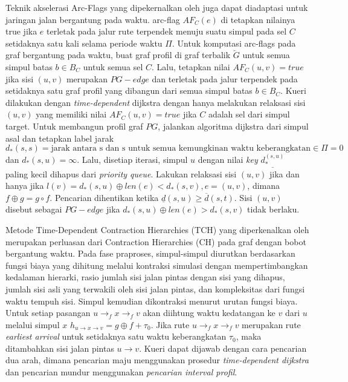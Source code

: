 Teknik akselerasi Arc-Flags yang dipekernalkan oleh \cite{Kohler2005} juga dapat diadaptasi untuk jaringan jalan bergantung pada waktu.  arc-flag $AF_C(e)$ di tetapkan nilainya true jika $e$ terletak pada jalur rute terpendek menuju suatu simpul pada sel $C$ setidaknya satu kali selama periode waktu $\Pi$. Untuk komputasi arc-flags pada graf bergantung pada waktu, buat graf profil di graf terbalik $\overleftarrow{G}$ untuk semua simpul batas $b\in B_C$ untuk semua sel $C$. Lalu, tetapkan nilai $AF_C(u,v)=true$ jika sisi $(u,v)$ merupakan $PG-edge$ dan terletak pada jalur terpendek pada setidaknya satu graf profil yang dibangun dari semua simpul batas $b\in B_C$. Kueri dilakukan dengan \textit{time-dependent} dijkstra dengan hanya melakukan relaksasi sisi $(u,v)$ yang memiliki nilai $AF_C(u,v)=true$ jika $C$ adalah sel dari simpul target. Untuk membangun profil graf $PG$, jalankan algoritma dijkstra dari simpul asal dan tetapkan label jarak $d_*(s,s)=\text{jarak antara s dan s untuk semua kemungkinan waktu keberangkatan} \in \Pi=0$ dan $d_*(s,u)=\infty$. Lalu, disetiap iterasi, simpul $u$ dengan nilai \textit{key} $\underline{d_*^{(s,u)}}$ paling kecil dihapus dari \textit{priority queue}. Lakukan relaksasi sisi $(u,v)$ jika dan hanya jika $l(v)=d_*(s,u)\oplus len(e)<d_*(s,v) , e=(u,v)$, dimana $f\oplus g=g\circ f$. Pencarian dihentikan ketika $\underline{d}(s,u)\geq \overline{d}(s,t)$. Sisi $(u,v)$ disebut sebagai $PG-edge$ jika $d_*(s,u)\oplus len(e)>d_*(s,v)$ tidak berlaku.



Metode Time-Dependent Contraction Hierarchies (TCH) yang diperkenalkan oleh \cite{Veit2013} merupakan perluasan dari Contraction Hierarchies (CH) pada graf dengan bobot bergantung waktu. Pada fase praproses, simpul-simpul diurutkan berdasarkan fungsi biaya yang dihitung melalui kontraksi simulasi dengan mempertimbangkan kedalaman hierarki, rasio jumlah sisi jalan pintas dengan sisi yang dihapus, jumlah sisi asli yang terwakili oleh sisi jalan pintas, dan kompleksitas dari fungsi waktu tempuh sisi. Simpul kemudian dikontraksi menurut urutan fungsi biaya. Untuk setiap pasangan $u\rightarrow_f x \rightarrow_f v$ akan diihtung waktu kedatangan ke $v$ dari $u$ melalui simpul $x$ $h_{u\rightarrow x \rightarrow v}=g\oplus f + \tau_0$. Jika rute $u\rightarrow_f x \rightarrow_f v$ merupakan rute \textit{earliest arrival}  untuk setidaknya satu  waktu keberangkatan $\tau_0$, maka ditambahkan sisi jalan pintas $u\rightarrow v$. Kueri dapat dijawab dengan cara pencarian dua arah, dimana pencarian maju menggunakan prosedur \textit{time-dependent dijkstra} dan pencarian mundur menggunakan \textit{pencarian interval profil}.


